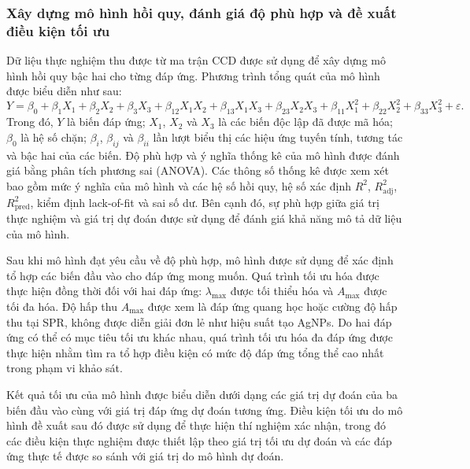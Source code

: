 \subsubsection{Xây dựng mô hình hồi quy, đánh giá độ phù hợp và đề xuất điều kiện tối ưu}
Dữ liệu thực nghiệm thu được từ ma trận CCD được sử dụng để xây dựng mô hình hồi quy bậc hai cho từng đáp ứng.
Phương trình tổng quát của mô hình được biểu diễn như sau:
\[
Y = \beta_0 + \beta_1X_1 + \beta_2X_2 + \beta_3X_3
+ \beta_{12}X_1X_2 + \beta_{13}X_1X_3 + \beta_{23}X_2X_3
+ \beta_{11}X_1^2 + \beta_{22}X_2^2 + \beta_{33}X_3^2 + \varepsilon.
\]
Trong đó, $Y$ là biến đáp ứng; $X_1$, $X_2$ và $X_3$ là các biến độc lập đã được mã hóa; $\beta_0$ là hệ số chặn; $\beta_i$, $\beta_{ij}$ và $\beta_{ii}$ lần lượt biểu thị các hiệu ứng tuyến tính, tương tác và bậc hai của các biến.
Độ phù hợp và ý nghĩa thống kê của mô hình được đánh giá bằng phân tích phương sai (ANOVA).
Các thông số thống kê được xem xét bao gồm mức ý nghĩa của mô hình và các hệ số hồi quy, hệ số xác định $R^2$, $R^2_{\mathrm{adj}}$, $R^2_{\mathrm{pred}}$, kiểm định lack-of-fit và sai số dư.
Bên cạnh đó, sự phù hợp giữa giá trị thực nghiệm và giá trị dự đoán được sử dụng để đánh giá khả năng mô tả dữ liệu của mô hình.

Sau khi mô hình đạt yêu cầu về độ phù hợp, mô hình được sử dụng để xác định tổ hợp các biến đầu vào cho đáp ứng mong muốn.
Quá trình tối ưu hóa được thực hiện đồng thời đối với hai đáp ứng: $\lambda_{\max}$ được tối thiểu hóa và $A_{\max}$ được tối đa hóa.
Độ hấp thu $A_{\max}$ được xem là đáp ứng quang học hoặc cường độ hấp thu tại SPR, không được diễn giải đơn lẻ như hiệu suất tạo AgNPs.
Do hai đáp ứng có thể có mục tiêu tối ưu khác nhau, quá trình tối ưu hóa đa đáp ứng được thực hiện nhằm tìm ra tổ hợp điều kiện có mức độ đáp ứng tổng thể cao nhất trong phạm vi khảo sát.
\par
Kết quả tối ưu của mô hình được biểu diễn dưới dạng các giá trị dự đoán của ba biến đầu vào cùng với giá trị đáp ứng dự đoán tương ứng.
Điều kiện tối ưu do mô hình đề xuất sau đó được sử dụng để thực hiện thí nghiệm xác nhận, trong đó các điều kiện thực nghiệm được thiết lập theo giá trị tối ưu dự đoán và các đáp ứng thực tế được so sánh với giá trị do mô hình dự đoán.
